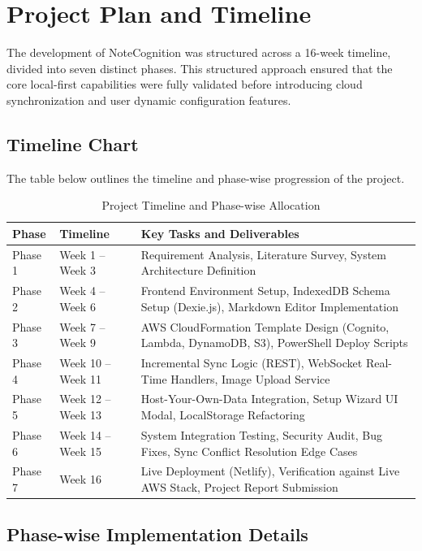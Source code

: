 \documentclass[12pt, a4paper, oneside]{report}
\begin{document}
\section{Project Plan and Timeline}

The development of NoteCognition was structured across a 16-week timeline, divided into seven distinct phases. This structured approach ensured that the core local-first capabilities were fully validated before introducing cloud synchronization and user dynamic configuration features.

\subsection{Timeline Chart}

The table below outlines the timeline and phase-wise progression of the project.

\begin{table}[H]
\centering
\caption{Project Timeline and Phase-wise Allocation}
\label{tab:timeline}
\begin{tabularx}{\textwidth}{|l|p{3.5cm}|X|}
\hline
\textbf{Phase} & \textbf{Timeline} & \textbf{Key Tasks and Deliverables} \\
\hline
Phase 1 & Week 1 -- Week 3 & Requirement Analysis, Literature Survey, System Architecture Definition \\
\hline
Phase 2 & Week 4 -- Week 6 & Frontend Environment Setup, IndexedDB Schema Setup (Dexie.js), Markdown Editor Implementation \\
\hline
Phase 3 & Week 7 -- Week 9 & AWS CloudFormation Template Design (Cognito, Lambda, DynamoDB, S3), PowerShell Deploy Scripts \\
\hline
Phase 4 & Week 10 -- Week 11 & Incremental Sync Logic (REST), WebSocket Real-Time Handlers, Image Upload Service \\
\hline
Phase 5 & Week 12 -- Week 13 & Host-Your-Own-Data Integration, Setup Wizard UI Modal, LocalStorage Refactoring \\
\hline
Phase 6 & Week 14 -- Week 15 & System Integration Testing, Security Audit, Bug Fixes, Sync Conflict Resolution Edge Cases \\
\hline
Phase 7 & Week 16 & Live Deployment (Netlify), Verification against Live AWS Stack, Project Report Submission \\
\hline
\end{tabularx}
\end{table}

\subsection{Phase-wise Implementation Details}
\end{document}
